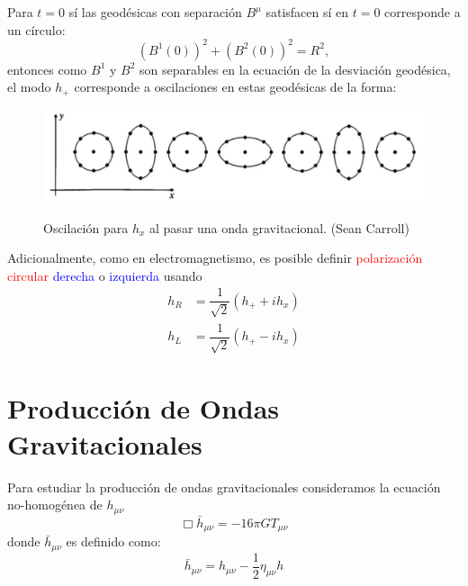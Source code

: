 \documentclass[../main]{subfiles}
\begin{document}
Para $t=0$ sí las geodésicas con separación $B^{\mu}$ satisfacen sí en $t=0$ corresponde a un círculo:
\begin{equation}
    (B^1(0))^2+(B^2(0))^2=R^2,
\end{equation}
entonces como $B^1$ y $B^2$ son separables en la ecuación de la desviación geodésica, el modo $h_+$ corresponde a oscilaciones en estas geodésicas de la forma:

\begin{figure}[h]
    \centering
    \includegraphics[width=.8\textwidth]{img/imgRG8.1.PNG}
    \label{fig8.1}
    \caption{Oscilación para $h_x$ al pasar una onda gravitacional. (Sean Carroll)}
\end{figure}

Adicionalmente, como en electromagnetismo, es posible definir \textcolor{red}{polarización circular} \textcolor{blue}{derecha} o \textcolor{blue}{izquierda} usando 
\begin{align}
    h_R&=\dfrac{1}{\sqrt{2}}(h_+ +ih_x)\\
    h_L&=\dfrac{1}{\sqrt{2}}(h_+ -ih_x)
\end{align}

\section{Producción de Ondas Gravitacionales}

Para estudiar la producción de ondas gravitacionales consideramos la ecuación no-homogénea de $h_{\mu\nu}$ 
\begin{equation}
    \Box \bar{h}_{\mu\nu}=-16\pi G T_{\mu\nu}
\end{equation}
donde $\bar{h}_{\mu\nu}$ es definido como:
\begin{equation}
    \bar{h}_{\mu\nu}=h_{\mu\nu}-\dfrac{1}{2}\eta_{\mu\nu}h
\end{equation}
\end{document}

